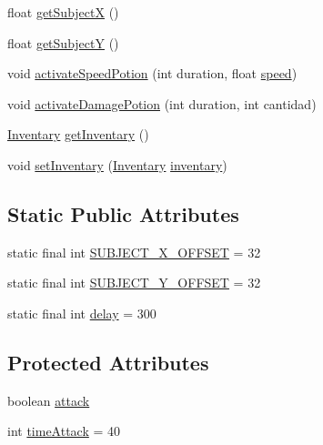\begin{DoxyCompactItemize}
\item 
float \mbox{\hyperlink{classentities_1_1_subject_a6b019eb16c336f596c24aa9d6a102c39}{get\+SubjectX}} ()
\item 
float \mbox{\hyperlink{classentities_1_1_subject_a0ce76d064a5b578263080e89e8990468}{get\+SubjectY}} ()
\item 
void \mbox{\hyperlink{classentities_1_1_subject_a882e12cd6888cb29f8aab5e34993fd7e}{activate\+Speed\+Potion}} (int duration, float \mbox{\hyperlink{classentities_1_1_mobile_entity_a815a9d2b23a0bb7e3ee7739d4c10d7c3}{speed}})
\item 
void \mbox{\hyperlink{classentities_1_1_subject_a48bfd8e519e56416c79a5bd8fea4f4aa}{activate\+Damage\+Potion}} (int duration, int cantidad)
\item 
\mbox{\hyperlink{classitems_1_1_inventary}{Inventary}} \mbox{\hyperlink{classentities_1_1_subject_a38fe8f9b3cc9f4c551163ae1f09f480b}{get\+Inventary}} ()
\item 
void \mbox{\hyperlink{classentities_1_1_subject_adf19d4419151e29ed50a9f1e138a2ee4}{set\+Inventary}} (\mbox{\hyperlink{classitems_1_1_inventary}{Inventary}} \mbox{\hyperlink{classentities_1_1_subject_a385ab8867c81188a3a092c3d8bd682fd}{inventary}})
\end{DoxyCompactItemize}
\subsection*{Static Public Attributes}
\begin{DoxyCompactItemize}
\item 
static final int \mbox{\hyperlink{classentities_1_1_subject_aa14a4aa541d95d7219e27c4a522eabd5}{S\+U\+B\+J\+E\+C\+T\+\_\+\+X\+\_\+\+O\+F\+F\+S\+ET}} = 32
\item 
static final int \mbox{\hyperlink{classentities_1_1_subject_a2d61d20205e6f806d5eabac535949d4a}{S\+U\+B\+J\+E\+C\+T\+\_\+\+Y\+\_\+\+O\+F\+F\+S\+ET}} = 32
\item 
static final int \mbox{\hyperlink{classentities_1_1_subject_a8a1c36c716eaa9ac06e8a1081c3545a0}{delay}} = 300
\end{DoxyCompactItemize}
\subsection*{Protected Attributes}
\begin{DoxyCompactItemize}
\item 
boolean \mbox{\hyperlink{classentities_1_1_subject_a1f8a6d36e95270aee0e8d46e1c6c0712}{attack}}
\item 
int \mbox{\hyperlink{classentities_1_1_subject_a497b24a97e5d4835bd5f8c70584701e2}{time\+Attack}} = 40
\end{DoxyCompactItemize}
